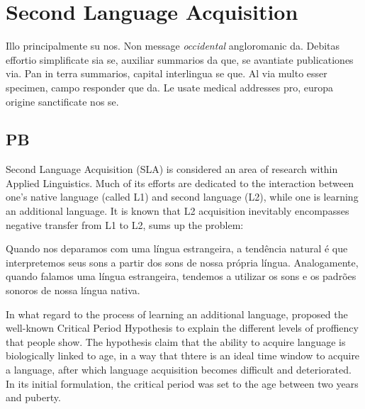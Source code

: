 \chapter{Second Language Acquisition}\label{ch:second-language}

Illo principalmente su nos. Non message \emph{occidental} angloromanic
da. Debitas effortio simplificate sia se, auxiliar summarios da que,
se avantiate publicationes via. Pan in terra summarios, capital
interlingua se que. Al via multo esser specimen, campo responder que
da. Le usate medical addresses pro, europa origine sanctificate nos
se.

\section{PB}

Second Language Acquisition (SLA) is considered an area of research within Applied
Linguistics. Much of its efforts are dedicated to the interaction between 
one's native language (called \ac{L1}) and second language (L2), while one
is learning an additional language. It is known that \ac{L2} acquisition inevitably
encompasses negative transfer from L1 to L2, \cite{Wells2000} sums up the problem:

Quando nos deparamos com uma l\'ingua estrangeira, a tend\^encia natural \'e
que interpretemos seus sons a partir dos sons de nossa pr\'opria l\'ingua.
Analogamente, quando falamos uma l\'ingua estrangeira, tendemos a utilizar
os sons e os padr\~oes sonoros de nossa l\'ingua nativa.

In what regard to the process of learning an additional language, \cite{Lenneberg1967}
proposed the well-known Critical Period Hypothesis to explain the different levels
of proffiency that people show. The hypothesis claim that the ability to acquire 
language is biologically linked to age, in a way that thtere is an ideal time window
to acquire a language, after which language acquisition becomes difficult and deteriorated.
In its initial formulation, the critical period was set to the age between two years and puberty.

